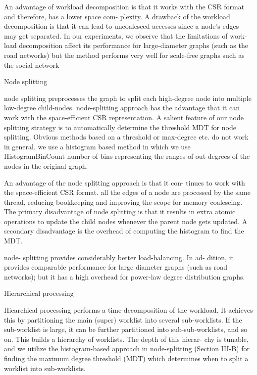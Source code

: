 \documentclass{article}
\begin{document}
An advantage of workload decomposition is that it works with the CSR format and therefore, has a lower space com- plexity. 
A drawback of the workload decomposition is that it can lead to uncoalesced accesses since a node’s edges may get separated. 
In our experiments, we observe that the limitations of work- load decomposition affect its performance for large-diameter graphs (such as the road networks) but the method performs very well for scale-free graphs such as the social network 

Node splitting

node splitting preprocesses the graph to split each high-degree node into multiple low-degree child-nodes.
node-splitting approach has the advantage that it can work with the space-efficient CSR representation. 
A salient feature of our node splitting strategy is to automatically determine the threshold MDT for node splitting. Obvious methods based on a threshold or max-degree etc. do not work in general.   we use a histogram based method in which we use HistogramBinCount number of bins representing the ranges of out-degrees of the nodes in the original graph. 

An advantage of the node splitting approach is that it con- tinues to work with the space-efficient CSR format.
all the edges of a node are processed by the same thread, reducing bookkeeping and improving the scope for memory coalescing. The primary disadvantage of node splitting is that it results in extra atomic operations to update the child nodes whenever the parent node gets updated. A secondary disadvantage is the overhead of computing the histogram to find the MDT. 

node- splitting provides considerably better load-balancing. In ad- dition, it provides comparable performance for large diameter graphs (such as road networks); but it has a high overhead for power-law degree distribution graphs. 

Hierarchical processing

Hiearchical processing performs a time-decomposition of the workload. It achieves this by partitioning the main (super) worklist into several sub-worklists. If the sub-worklist is large, it can be further partitioned into sub-sub-worklists, and so on. This builds a hierarchy of worklists. The depth of this hierar- chy is tunable, and we utilize the histogram-based approach in node-splitting (Section III-B) for finding the maximum degree threshold (MDT) which determines when to split a worklist into sub-worklists. 
\end{document}
